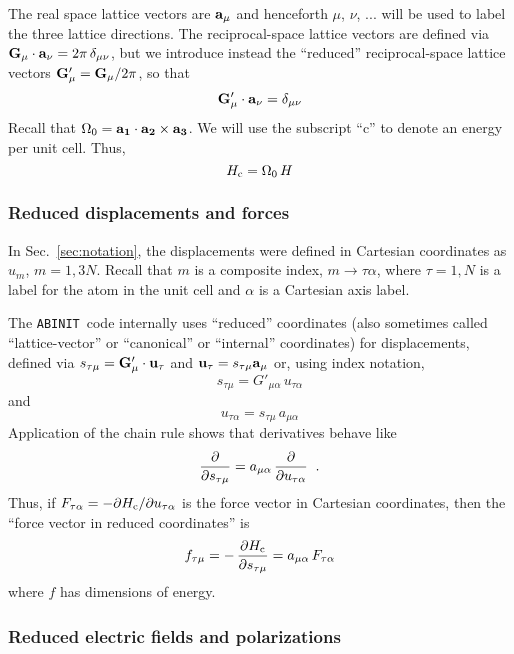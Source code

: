 \documentclass[11pt,fleqn]{article}
\def\beq{\begin{equation}}
\def\eeq{\end{equation}}
\def\a{{\bf a}}
\def\G{{\bf G}}
\def\u{{\bf u}}
\def\Oo{\Omega_0}
\def\bc{_{\rm c}}
\def\ABINIT{{{\tt ABINIT}}}
\begin{document}
The real space lattice vectors are $\a_\mu$ and henceforth
$\mu$, $\nu$, ... will be used to label the three lattice
directions.  The reciprocal-space lattice vectors are defined via
\linebreak
$\G_\mu\cdot\a_\nu=2\pi\,\delta_{\mu\nu}$, but we introduce instead
the ``reduced'' reciprocal-space lattice vectors
$\G'_\mu=\G_\mu/2\pi$, so that
%
\beq
\G'_\mu\cdot\a_\nu=\delta_{\mu\nu}
\eeq
%
Recall that $\Oo={\bf a_1}\cdot{\bf a_2}\times{\bf a_3}$.
We will use the subscript ``c'' to denote an energy per unit cell.
Thus,
%
\beq
H\bc=\Oo\,H
\eeq

\subsubsection{Reduced displacements and forces}

In Sec.~\ref{sec:notation}, the displacements were defined in
Cartesian coordinates as $u_m$, $m=1,3N$.  Recall that $m$ is
a composite index, $m\rightarrow\tau\alpha$, where $\tau=1,N$
is a label for the atom in the unit cell and $\alpha$ is a
Cartesian axis label.

The \ABINIT\ code internally uses ``reduced'' coordinates (also
sometimes called ``lattice-vector'' or ``canonical'' or ``internal''
coordinates) for displacements, defined via
$s_{\tau\mu}=\G'_\mu\cdot\u_\tau$ and
$\u_\tau=s_{\tau\mu}\a_\mu$ or, using index notation,
%
\beq
s_{\tau\mu}=G'_{\mu\alpha}\,u_{\tau\alpha}
\eeq
%
and
%
\beq
u_{\tau\alpha}=s_{\tau\mu}\,a_{\mu\alpha}
\eeq
%
Application of the chain rule shows that derivatives behave like
%
\beq
{\partial\over\partial s_{\tau\mu}}=a_{\mu\alpha}\,
{\partial\over\partial u_{\tau\alpha}}
\;\;.
\eeq
%
Thus, if $F_{\tau\alpha}=-\partial H\bc/\partial u_{\tau\alpha}$
is the force vector in Cartesian coordinates, then the ``force
vector in reduced coordinates'' is
%
\beq
f_{\tau\mu}=-\,{\partial H\bc\over \partial s_{\tau\mu}}
  = a_{\mu\alpha}\,F_{\tau\alpha}
\eeq
%
where $f$ has dimensions of energy.

\subsubsection{Reduced electric fields and polarizations}
\end{document}
